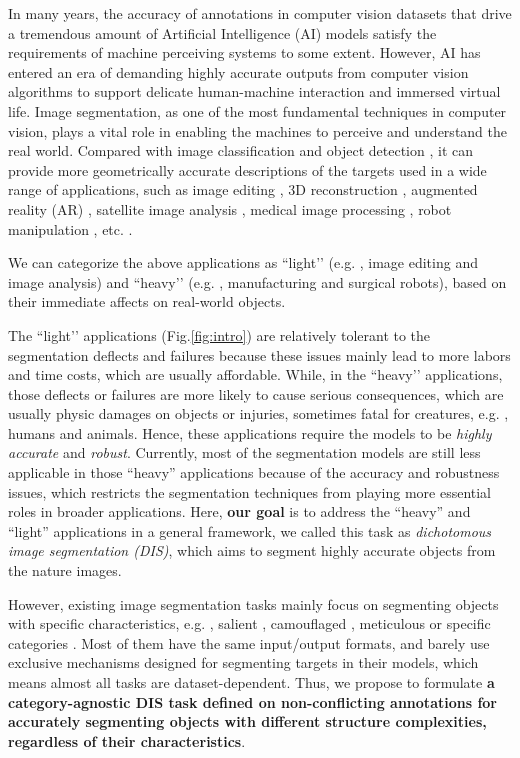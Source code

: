 In many years, the accuracy of annotations in computer vision datasets that drive a tremendous amount of Artificial Intelligence (AI) models satisfy the requirements of machine perceiving systems to some extent. However, AI has entered an era of demanding highly accurate outputs from computer vision algorithms to support delicate human-machine interaction and immersed virtual life. Image segmentation, as one of the most fundamental techniques in computer vision, plays a vital role in enabling the machines to perceive and understand the real world. Compared with image classification \cite{imagenet_cvpr09,DBLP:conf/nips/KrizhevskySH12,simonyan2014very} and object detection \cite{DBLP:conf/cvpr/GirshickDDM14,girshick2015fast,ren2015faster}, it can provide more geometrically accurate descriptions of the targets used in a wide range of applications, such as image editing \cite{goferman2012context}, 3D reconstruction \cite{Liu_2021_CVPR}, augmented reality (AR) \cite{qin2021boundary}, satellite image analysis \cite{DBLP:journals/remotesensing/WeiLLZCJZY21}, medical image processing \cite{ronneberger2015u}, robot manipulation \cite{DBLP:conf/rss/Chen0LH21}, etc. . 

We can categorize the above applications as ``light’’ (e.g. , image editing and image analysis) and ``heavy’’ (e.g. , manufacturing and surgical robots), based on their immediate affects on real-world objects. 

The ``light’’ applications (Fig.\ref{fig:intro}) are relatively tolerant to the segmentation deflects and failures because these issues mainly lead to more labors and time costs, which are usually affordable. While, in the ``heavy’’ applications, those deflects or failures are more likely to cause serious consequences, which are usually physic damages on objects or injuries, sometimes fatal for creatures, e.g. , humans and animals. Hence, these applications require the models to be \textit{highly accurate} and \textit{robust}. 
Currently, most of the segmentation models are still less applicable in those ``heavy'' applications because of the accuracy and robustness issues, which restricts the segmentation techniques from playing more essential roles in broader applications. Here, \textbf{our goal} is to address the ``heavy'' and ``light'' applications in a general framework, we called this task as \textit{dichotomous image segmentation (DIS)}, which aims to segment highly accurate objects from the nature images.

However, existing image segmentation tasks mainly focus on segmenting objects with specific characteristics, e.g. , salient \cite{wang2017learning,zeng2019towards,HRRN_ICCV2021}, camouflaged \cite{le2019anabranch,chameleon,fan2020camouflaged}, meticulous \cite{liew2021deep,yang2020meticulous} or specific categories \cite{ronneberger2015u,MnihThesis,shen2016automatic,MODNet,DBLP:journals/corr/abs-2108-11515}. Most of them have the same input/output formats, and barely use exclusive mechanisms designed for segmenting targets in their models, which means almost all tasks are dataset-dependent. Thus, we propose to formulate \textbf{a category-agnostic DIS task defined on non-conflicting annotations for accurately segmenting objects with different structure complexities, regardless of their characteristics}. 

